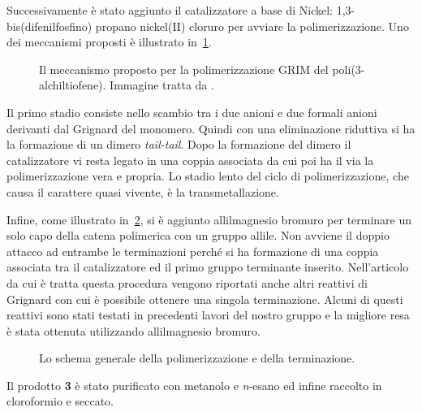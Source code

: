 Successivamente è stato aggiunto il catalizzatore a base di Nickel: 1,3-bis(difenilfosfino) propano nickel(II) cloruro per avviare la polimerizzazione. 
Uno dei meccanismi proposti è illustrato in~\ref{fig:pol-polimerizz}.
\begin{figure}
\caption{\footnotesize{Il meccanismo proposto per la polimerizzazione GRIM del poli(3-alchiltiofene). Immagine tratta da \cite{pol-grim-living}.}
\label{fig:pol-polimerizz}}
\end{figure}
Il primo stadio consiste nello scambio tra i due anioni  e due formali anioni derivanti dal Grignard del monomero. Quindi con una eliminazione riduttiva si ha la formazione di un dimero \emph{tail-tail}\label{tail-tail}. Dopo la formazione del dimero il catalizzatore vi resta legato in una coppia associata da cui poi ha il via la polimerizzazione vera e propria. 
Lo stadio lento del ciclo di polimerizzazione, che causa il carattere quasi vivente, è la transmetallazione. 

Infine, come illustrato in~\ref{fig:grim-end}, si è aggiunto allilmagnesio bromuro per terminare un solo capo della catena polimerica con un gruppo allile. Non avviene il doppio attacco ad entrambe le terminazioni perché si ha formazione di una coppia associata tra il catalizzatore ed il primo gruppo terminante inserito. Nell'articolo \cite{pol-p3ht-end} da cui è tratta questa procedura vengono riportati anche altri reattivi di Grignard con cui è possibile ottenere una singola terminazione. Alcuni di questi reattivi sono stati testati in precedenti lavori del nostro gruppo e la migliore resa è stata ottenuta utilizzando allilmagnesio bromuro.

\begin{figure}
\caption{\footnotesize{Lo schema generale della polimerizzazione e della terminazione.}
\label{fig:grim-end}}
\end{figure}
Il prodotto {\bf 3} è stato purificato con metanolo e {\itshape n}-esano ed infine raccolto in cloroformio e seccato. 

